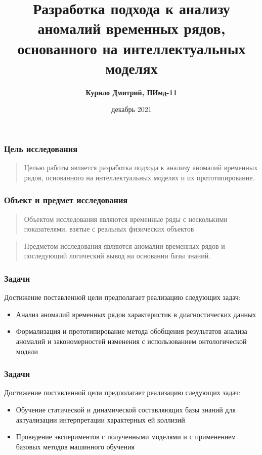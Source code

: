 \documentclass[aspectratio=1610,17pt,utf8]{beamer}
\title[Shorter Title]{Разработка подхода к анализу аномалий временных рядов, основанного на интеллектуальных моделях}
\author{\textbf{Курило Дмитрий, ПИмд-11}}
\institute[]
{
  Ульяновский государственный технический университет
}
\date{декабрь 2021}
\begin{document}
	\maketitle
	
	\begin{frame}
		\frametitle{Цель исследования}
		\begin{quotation}
			Целью работы является разработка подхода к анализу аномалий временных рядов, основанного на интеллектуальных моделях и их прототипирование.
		\end{quotation}
	\end{frame}
	
	
	\begin{frame}
		\frametitle{Объект и предмет исследования}
		\begin{quotation}
			Объектом исследования являются временные ряды с несколькими показателями, взятые с реальных физических объектов
		\end{quotation}
		
		\begin{quotation}
			Предметом исследования являются аномалии временных рядов и последующий логический вывод на основании базы знаний.
		\end{quotation}
	\end{frame}

	\begin{frame}
		\frametitle{Задачи}
		Достижение поставленной цели предполагает реализацию следующих задач:
		\begin{itemize}
		    \item Анализ аномалий временных рядов характеристик в диагностических данных
			\item Формализация и прототипирование метода обобщения результатов анализа аномалий и закономерностей изменения с использованием онтологической модели
			
		\end{itemize}
	\end{frame}	
	
	\begin{frame}
		\frametitle{Задачи}
		Достижение поставленной цели предполагает реализацию следующих задач:
		\begin{itemize}
		   \item Обучение статической и динамической составляющих базы знаний для актуализации интерпретации характерных ей коллизий
			\item Проведение экспериментов с полученными моделями и с применением базовых методов машинного обучения
		\end{itemize}
	\end{frame}
	
\end{document}
